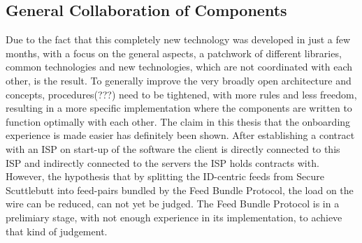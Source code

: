 \subsection{General Collaboration of Components}
Due to the fact that this completely new technology was developed in just a few months, with a focus on the general aspects, a patchwork of different libraries, common technologies and new technologies, which are not coordinated with each other, is the result. To generally improve the very broadly open architecture and concepts, procedures(???) need to be tightened, with more rules and less freedom, resulting in a more specific implementation where the components are written to function optimally with each other.  The claim in this thesis that the onboarding experience is made easier has definitely been shown. After establishing a contract with an ISP on start-up of the software the client is directly connected to this ISP and indirectly connected to the  servers the ISP holds contracts with. However, the hypothesis that by splitting the ID-centric feeds from Secure Scuttlebutt into feed-pairs bundled by the Feed Bundle Protocol, the load on the wire can be reduced, can not yet be judged. The Feed Bundle Protocol is in a prelimiary stage, with not enough experience in its implementation, to achieve that kind of judgement.